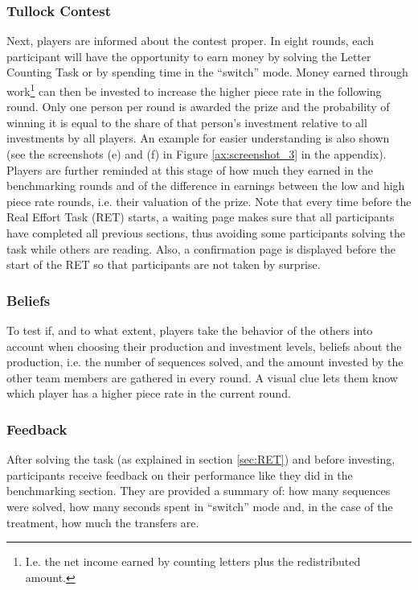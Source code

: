     \subsubsection{Tullock Contest}
    
    Next, players are informed about the contest proper. In eight rounds, each participant will have the opportunity to earn money by solving the Letter Counting Task or by spending time in the ``switch'' mode. Money earned through work\footnote{I.e. the net income earned by counting letters plus the redistributed amount.} can then be invested to increase the higher piece rate in the following round. Only one person per round is awarded the prize and the probability of winning it is equal to the share of that person's investment relative to all investments by all players. An example for easier understanding is also shown (see the screenshots (e) and (f) in Figure \ref{ax:screenshot_3} in the appendix).\\
    
    Players are further reminded at this stage of how much they earned in the benchmarking rounds and of the difference in earnings between the low and high piece rate rounds, i.e. their valuation of the prize. Note that every time before the Real Effort Task (RET) starts, a waiting page makes sure that all participants have completed all previous sections, thus avoiding some participants solving the task while others are reading. Also, a confirmation page is displayed before the start of the RET so that participants are not taken by surprise.
   
    \subsubsection{Beliefs}
    
    To test if, and to what extent, players take the behavior of the others into account when choosing their production and investment levels, beliefs about the production, i.e. the number of sequences solved, and the amount invested by the other team members are gathered in every round. A visual clue lets them know which player has a higher piece rate in the current round.
    
    \subsubsection{Feedback}
    
    After solving the task (as explained in section \ref{sec:RET}) and before investing, participants receive feedback on their performance like they did in the benchmarking section. They are provided a summary of: how many sequences were solved, how many seconds spent in ``switch'' mode and, in the case of the treatment, how much the transfers are.\\
    
